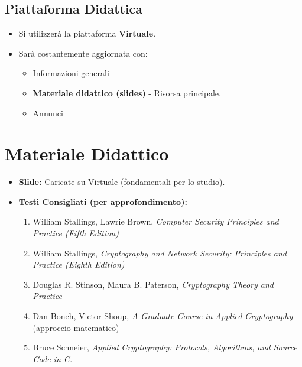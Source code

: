 \subsection{Piattaforma Didattica}
\begin{itemize}
    \item Si utilizzerà la piattaforma \textbf{Virtuale}.
    \item Sarà costantemente aggiornata con:
    \begin{itemize}
        \item Informazioni generali
        \item \textbf{Materiale didattico (slides)} - Risorsa principale.
        \item Annunci
    \end{itemize}
\end{itemize}

\section{Materiale Didattico}
\begin{itemize}
    \item \textbf{Slide:} Caricate su Virtuale (fondamentali per lo studio).
    \item \textbf{Testi Consigliati (per approfondimento):}
    \begin{enumerate}
        \item William Stallings, Lawrie Brown, \textit{Computer Security Principles and Practice (Fifth Edition)}
        \item William Stallings, \textit{Cryptography and Network Security: Principles and Practice (Eighth Edition)}
        \item Douglas R. Stinson, Maura B. Paterson, \textit{Cryptography Theory and Practice}
        \item Dan Boneh, Victor Shoup, \textit{A Graduate Course in Applied Cryptography} (approccio matematico)
        \item Bruce Schneier, \textit{Applied Cryptography: Protocols, Algorithms, and Source Code in C.}
    \end{enumerate}
\end{itemize}

